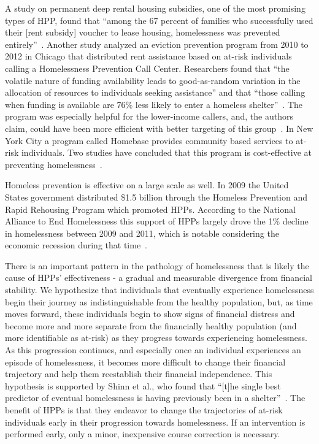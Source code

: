 \documentclass[10pt,letterpaper]{article}
\begin{document}
A study on permanent deep rental housing subsidies, one of the most promising types of HPP, found that ``among the 67 percent of families who successfully used their [rent subsidy] voucher to lease housing, homelessness was prevented entirely''~\cite{shinn2019homelessness}. Another study analyzed an eviction prevention program from 2010 to 2012 in Chicago that distributed rent assistance based on at-risk individuals calling a Homelessness Prevention Call Center. Researchers found that ``the volatile nature of funding availability leads to good-as-random variation in the allocation of resources to individuals seeking assistance'' and that ``those calling when funding is available are 76\% less likely to enter a homeless shelter''~\cite{evans2016impact}. The program was especially helpful for the lower-income callers, and, the authors claim, could have been more efficient with better targeting of this group~\cite{evans2016impact}. In New York City a program called Homebase provides community based services to at-risk individuals. Two studies have concluded that this program is cost-effective at preventing homelessness~\cite{rolston2013evaluation, goodman2016homelessness}.

Homeless prevention is effective on a large scale as well. In 2009 the United States government distributed \$1.5 billion through the Homeless Prevention and Rapid Rehousing Program which promoted HPPs. According to the National Alliance to End Homelessness this support of HPPs largely drove the 1\% decline in homelessness between 2009 and 2011, which is notable considering the economic recession during that time~\cite{shinn2013efficient}.

There is an important pattern in the pathology of homelessness that is likely the cause of HPPs' effectiveness - a gradual and measurable divergence from financial stability. We hypothesize that individuals that eventually experience homelessness begin their journey as indistinguishable from the healthy population, but, as time moves forward, these individuals begin to show signs of financial distress and become more and more separate from the financially healthy population (and more identifiable as at-risk) as they progress towards experiencing homelessness. As this progression continues, and especially once an individual experiences an episode of homelessness, it becomes more difficult to change their financial trajectory and help them reestablish their financial independence. This hypothesis is supported by Shinn et al., who found that ``[t]he single best predictor of eventual homelessness is having previously been in a shelter''~\cite{shinn2019homelessness}. The benefit of HPPs is that they endeavor to change the trajectories of at-risk individuals early in their progression towards homelessness. If an intervention is performed early, only a minor, inexpensive course correction is necessary. 
\end{document}
